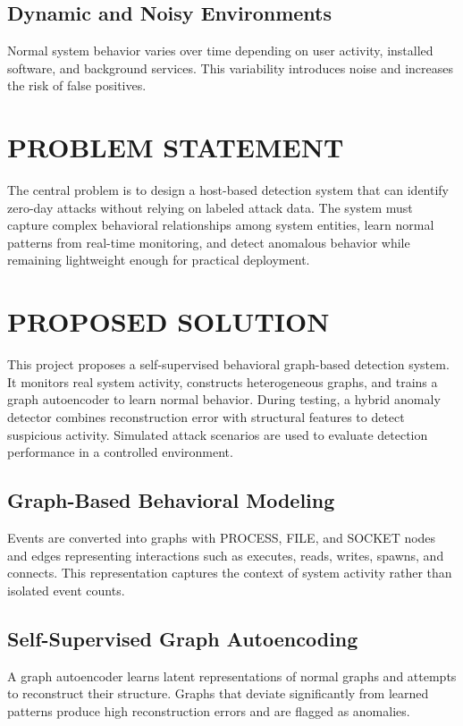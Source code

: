 \subsection{Dynamic and Noisy Environments}
Normal system behavior varies over time depending on user activity, installed
software, and background services. This variability introduces noise and increases
the risk of false positives.

\section{PROBLEM STATEMENT}
The central problem is to design a host-based detection system that can identify
zero-day attacks without relying on labeled attack data. The system must capture
complex behavioral relationships among system entities, learn normal patterns from
real-time monitoring, and detect anomalous behavior while remaining lightweight
enough for practical deployment.

\section{PROPOSED SOLUTION}
This project proposes a self-supervised behavioral graph-based detection system.
It monitors real system activity, constructs heterogeneous graphs, and trains a
graph autoencoder to learn normal behavior. During testing, a hybrid anomaly
detector combines reconstruction error with structural features to detect suspicious
activity. Simulated attack scenarios are used to evaluate detection performance in
a controlled environment.

\subsection{Graph-Based Behavioral Modeling}
Events are converted into graphs with PROCESS, FILE, and SOCKET nodes and edges
representing interactions such as executes, reads, writes, spawns, and connects.
This representation captures the context of system activity rather than isolated
event counts.

\subsection{Self-Supervised Graph Autoencoding}
A graph autoencoder learns latent representations of normal graphs and attempts to
reconstruct their structure. Graphs that deviate significantly from learned patterns
produce high reconstruction errors and are flagged as anomalies.

